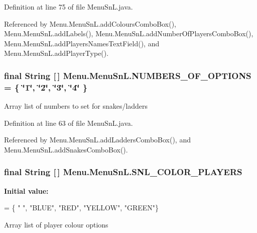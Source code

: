 Definition at line 75 of file Menu\+Sn\+L.\+java.



Referenced by Menu.\+Menu\+Sn\+L.\+add\+Colours\+Combo\+Box(), Menu.\+Menu\+Sn\+L.\+add\+Labels(), Menu.\+Menu\+Sn\+L.\+add\+Number\+Of\+Players\+Combo\+Box(), Menu.\+Menu\+Sn\+L.\+add\+Players\+Names\+Text\+Field(), and Menu.\+Menu\+Sn\+L.\+add\+Player\+Type().

\hypertarget{class_menu_1_1_menu_sn_l_aa0ead71ad043fc5f187fde721b34c34b}{}
\subsubsection[{N\+U\+M\+B\+E\+R\+S\+\_\+\+O\+F\+\_\+\+O\+P\+T\+I\+O\+N\+S}]{\setlength{\rightskip}{0pt plus 5cm}final String \mbox{[}$\,$\mbox{]} Menu.\+Menu\+Sn\+L.\+N\+U\+M\+B\+E\+R\+S\+\_\+\+O\+F\+\_\+\+O\+P\+T\+I\+O\+N\+S = \{ \char`\"{}1\char`\"{}, \char`\"{}2\char`\"{}, \char`\"{}3\char`\"{}, \char`\"{}4\char`\"{} \}\hspace{0.3cm}{\ttfamily [private]}}\label{class_menu_1_1_menu_sn_l_aa0ead71ad043fc5f187fde721b34c34b}
Array list of numbers to set for snakes/ladders 

Definition at line 63 of file Menu\+Sn\+L.\+java.



Referenced by Menu.\+Menu\+Sn\+L.\+add\+Ladders\+Combo\+Box(), and Menu.\+Menu\+Sn\+L.\+add\+Snakes\+Combo\+Box().

\hypertarget{class_menu_1_1_menu_sn_l_aa0aa3bcb48114b48faa0a49fa0c98504}{}
\subsubsection[{S\+N\+L\+\_\+\+C\+O\+L\+O\+R\+\_\+\+P\+L\+A\+Y\+E\+R\+S}]{\setlength{\rightskip}{0pt plus 5cm}final String \mbox{[}$\,$\mbox{]} Menu.\+Menu\+Sn\+L.\+S\+N\+L\+\_\+\+C\+O\+L\+O\+R\+\_\+\+P\+L\+A\+Y\+E\+R\+S\hspace{0.3cm}{\ttfamily [private]}}\label{class_menu_1_1_menu_sn_l_aa0aa3bcb48114b48faa0a49fa0c98504}
{\bfseries Initial value\+:}
\begin{DoxyCode}
= \{ \textcolor{stringliteral}{" "}, \textcolor{stringliteral}{"BLUE"}, \textcolor{stringliteral}{"RED"},
            \textcolor{stringliteral}{"YELLOW"}, \textcolor{stringliteral}{"GREEN"}\}
\end{DoxyCode}
Array list of player colour options 

